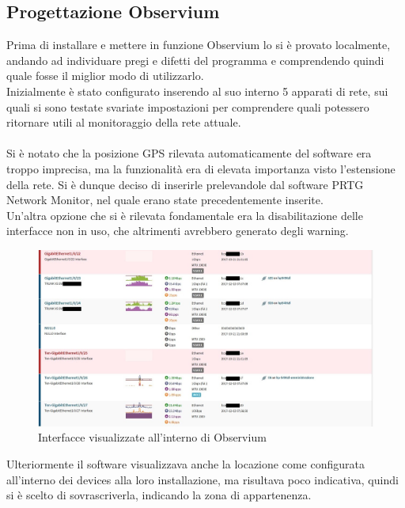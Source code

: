 \documentclass[Realizzazione.tex]{subfiles}
\begin{document}
\subsection{Progettazione Observium}
Prima di installare e mettere in funzione Observium lo si è provato localmente, andando ad individuare pregi e difetti del programma e comprendendo quindi quale fosse il miglior modo di utilizzarlo.\\
Inizialmente è stato configurato inserendo al suo interno 5 apparati di rete, sui quali si sono testate svariate impostazioni per comprendere quali potessero ritornare utili al monitoraggio della rete attuale.\\\\
Si è notato che la posizione GPS rilevata automaticamente del software era troppo imprecisa, ma la funzionalità era di elevata importanza visto l'estensione della rete. Si è dunque deciso di inserirle prelevandole dal software PRTG Network Monitor, nel quale erano state precedentemente inserite. \\
Un'altra opzione che si è rilevata fondamentale era la disabilitazione delle interfacce non in uso, che altrimenti avrebbero generato degli warning. \\
\begin{figure}[H]
	\centering
	\includegraphics[width=1\linewidth]{"images/Observium_porte"}
	\caption{Interfacce visualizzate all'interno di Observium}
	\label{fig:Interfacce visualizzate all'interno di Observium}
\end{figure}
Ulteriormente il software visualizzava anche la locazione come configurata all'interno dei devices alla loro installazione, ma risultava poco indicativa, quindi si è scelto di sovrascriverla, indicando la zona di appartenenza.
\end{document}
